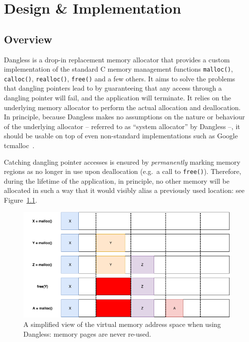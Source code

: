 \chapter{Design \& Implementation}
\label{ch:implementation}

\section{Overview}

Dangless is a drop-in replacement memory allocator that provides a custom implementation of the standard C memory management functions \lstinline!malloc()!, \lstinline!calloc()!, \lstinline!realloc()!, \lstinline!free()! and a few others. It aims to solve the problems that dangling pointers lead to by guaranteeing that any access through a dangling pointer will fail, and the application will terminate. It relies on the underlying memory allocator to perform the actual allocation and deallocation. In principle, because Dangless makes no assumptions on the nature or behaviour of the underlying allocator -- referred to as ``system allocator'' by Dangless --, it should be usable on top of even non-standard implementations such as Google tcmalloc~\cite{google-tcmalloc}.

Catching dangling pointer accesses is ensured by \emph{permanently} marking memory regions as no longer in use upon deallocation (e.g.\ a call to \lstinline!free()!). Therefore, during the lifetime of the application, in principle, no other memory will be allocated in such a way that it would visibly alias a previously used location: see Figure~\ref{fig:dangless_simplified}.

\begin{figure}
	\centering
	\includegraphics[width=\textwidth]{img/dangless_simplified.png}
	\caption{A simplified view of the virtual memory address space when using Dangless: memory pages are never re-used.}
	\label{fig:dangless_simplified}
\end{figure}

